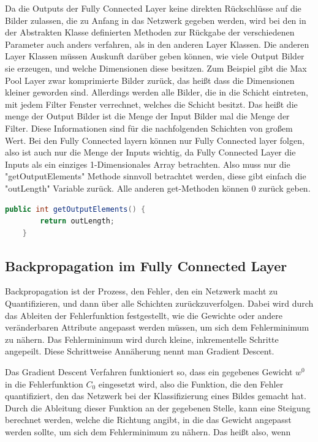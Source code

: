 \documentclass[12pt]{article}
\begin{document}
Da die Outputs der Fully Connected Layer keine direkten Rückschlüsse auf die Bilder zulassen, die zu Anfang in das Netzwerk gegeben werden, wird bei den in der Abstrakten Klasse definierten Methoden zur Rückgabe der verschiedenen Parameter auch anders verfahren, als in den anderen Layer Klassen. Die anderen Layer Klassen müssen Auskunft darüber geben können, wie viele Output Bilder sie erzeugen, und welche Dimensionen diese besitzen. Zum Beispiel gibt die Max Pool Layer zwar komprimierte Bilder zurück, das heißt dass die Dimensionen kleiner geworden sind. Allerdings werden alle Bilder, die in die Schicht eintreten, mit jedem Filter Fenster verrechnet, welches die Schicht besitzt. Das heißt die menge der Output Bilder ist die Menge der Input Bilder mal die Menge der Filter. Diese Informationen sind für die nachfolgenden Schichten von großem Wert. Bei den Fully Connected layern können nur Fully Connected layer folgen, also ist auch nur die Menge der Inputs wichtig, da Fully Connected Layer die Inputs als ein einziges 1-Dimensionales Array betrachten. Also muss nur die "getOutputElements" Methode sinnvoll betrachtet werden, diese gibt einfach die "outLength" Variable zurück. Alle anderen get-Methoden können 0 zurück geben.

\begin{lstlisting}[language=Java] 
    public int getOutputElements() {
        return outLength;
    }
\end{lstlisting} 
\clearpage
\subsection{Backpropagation im Fully Connected Layer}
Backpropagation ist der Prozess, den Fehler, den ein Netzwerk macht zu Quantifizieren, und dann über alle Schichten zurückzuverfolgen. Dabei wird durch das Ableiten der Fehlerfunktion festgestellt, wie die Gewichte oder andere veränderbaren Attribute angepasst werden müssen, um sich dem Fehlerminimum zu nähern. Das Fehlerminimum wird durch kleine, inkrementelle Schritte angepeilt. Diese Schrittweise Annäherung nennt man Gradient Descent. 

Das Gradient Descent Verfahren funktioniert so, dass ein gegebenes Gewicht $w^0$ in die Fehlerfunktion $C_0$ eingesetzt wird, also die Funktion, die den Fehler quantifiziert, den das Netzwerk bei der Klassifizierung eines Bildes gemacht hat. Durch die Ableitung dieser Funktion an der gegebenen Stelle, kann eine Steigung berechnet werden, welche die Richtung angibt, in die das Gewicht angepasst werden sollte, um sich dem Fehlerminimum zu nähern. 
Das heißt also, wenn 
\end{document}
